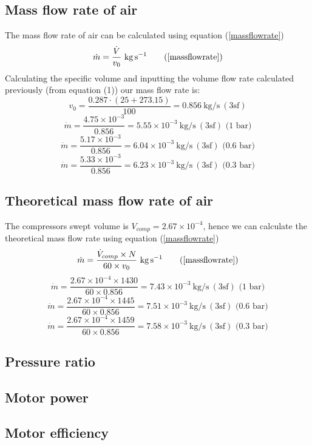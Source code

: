 \documentclass[class=article, crop=false, 12pt,a4paper]{standalone}
\begin{document}
\subsection{Mass flow rate of air}
The mass flow rate of air can be calculated using equation (\ref{massflowrate})
\begin{equation}
  \dot{m} = \frac{\dot{V}}{v_0} \ \si{\kg\per\second}
  \tag{\ref{massflowrate}}
\end{equation}
Calculating the specific volume and inputting the volume flow rate calculated previously (from equation (1)) our mass flow rate is:
\[ v_0 = \frac{0.287 \cdot (25+273.15)}{100} = 0.856 \ \si{\kg\per\second} \ (3\textrm{sf})  \]
\[ \dot{m} = \frac{4.75 \times 10^{-3}}{0.856} = 5.55 \times 10^{-3} \ \si{\kg\per\second} \ (3\textrm{sf}) \textrm{ (1 bar)} \]
\[ \dot{m} = \frac{5.17 \times 10^{-3}}{0.856} = 6.04 \times 10^{-3} \ \si{\kg\per\second} \ (3\textrm{sf}) \textrm{ (0.6 bar)} \]
\[ \dot{m} = \frac{5.33 \times 10^{-3}}{0.856} = 6.23 \times 10^{-3} \ \si{\kg\per\second} \ (3\textrm{sf}) \textrm{ (0.3 bar)} \]
\subsection{Theoretical mass flow rate of air}
The compressors swept volume is \(V_{comp} = 2.67 \times 10^{-4}\), hence we can calculate the theoretical mass flow rate using equation (\ref{massflowrate})
\begin{equation}
  \dot{m} = \frac{\dot{V}_{comp} \times N}{60 \times v_0} \ \si{\kg\per\second}
  \tag{\ref{massflowrate}}
\end{equation}
\[ \dot{m} = \frac{2.67 \times 10^{-4} \times 1430}{60 \times 0.856} = 7.43 \times 10^{-3} \ \si{\kg\per\second} \ (3\textrm{sf}) \textrm{ (1 bar)}\]
\[ \dot{m} = \frac{2.67 \times 10^{-4} \times 1445}{60 \times 0.856} = 7.51 \times 10^{-3} \ \si{\kg\per\second} \ (3\textrm{sf}) \textrm{ (0.6 bar)}\]
\[ \dot{m} = \frac{2.67 \times 10^{-4} \times 1459}{60 \times 0.856} = 7.58 \times 10^{-3} \ \si{\kg\per\second} \ (3\textrm{sf}) \textrm{ (0.3 bar)}\]

\subsection{Pressure ratio}
\subsection{Motor power}
\subsection{Motor efficiency}
\end{document}
